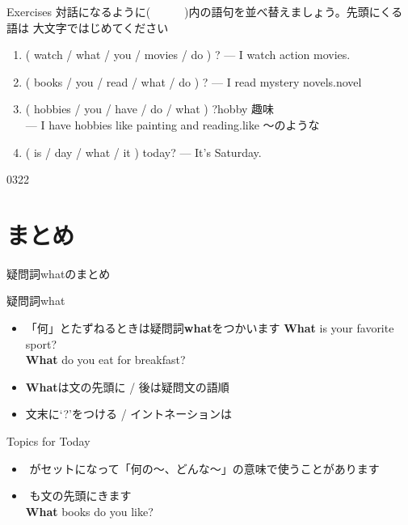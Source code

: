\documentclass[aspectratio=169,xcolor={dvipsnames,table}]{beamer}
\begin{document}
\begin{frame}[plain]{Exercises}
 対話になるように(~~~~~~)内の語句を並べ替えましょう。先頭にくる語は
大文字ではじめてください
\begin{enumerate}
 \item ( watch / what / you / movies / do ) ? --- I watch action movies.\\
 \item ( books / you / read / what / do ) ? --- I read mystery novels.\hfill{\scriptsize novel }\\
 \item ( hobbies / you / have / do / what ) ?\hfill{}{\scriptsize hobby  趣味}\\
\mbox{}\hfill{}--- I have hobbies like painting and reading.\hfill{}{\scriptsize like 〜のような}\\
 \item ( is / day / what / it )  today? --- It's Saturday.\\
\hfill{}
\end{enumerate}

\mbox{}\hfill{\tiny 0322}\,{\scriptsize {}}

\end{frame}
\section{まとめ}
\begin{frame}[plain]{疑問詞whatのまとめ}

\begin{block}{疑問詞what }
\begin{itemize}[square]\small
 \item \<「何」とたずねるときは疑問詞\textbf{what}をつかいます%
\hfill{\scriptsize \textbf{What} is your favorite sport?}\\
\hfill{\scriptsize \textbf{What} do you eat for breakfast?}
 \item \textbf{What}は文の先頭に / 後は疑問文の語順
 \item   文末に`?'をつける / イントネーションは\myDownwardPitch{}
\end{itemize}
     \end{block}

\begin{block}{Topics for Today}
\begin{itemize}[square]\small
 \item {}\,\,がセットになって「何の〜、どんな～」の意味で使うことがあります
 \item {}\,\,も文の先頭にきます\\
\hfill{\scriptsize \textbf{What} books do you like?}
\end{itemize}
     \end{block}
\end{frame}
\end{document}
